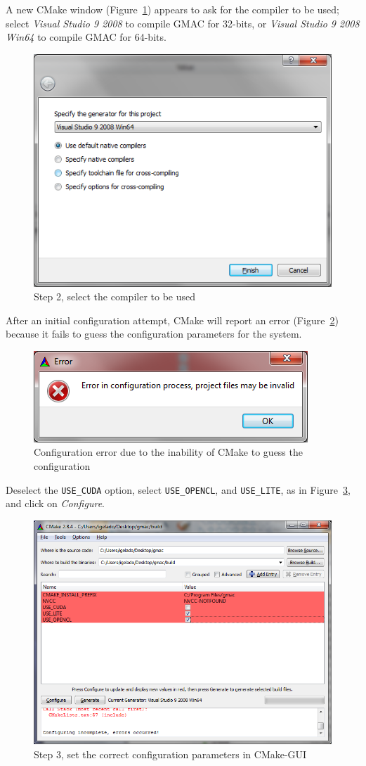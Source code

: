 A new CMake window (Figure~\ref{fig:install:cmake-compiler}) appears to ask for the compiler to be 
used; select \emph{Visual Studio 9 2008} to compile GMAC for 32\hyp{}bits, or \emph{Visual Studio 9 
2008 Win64} to compile GMAC for 64\hyp{}bits.
\begin{figure}[h]
\centering
\includegraphics[width=0.6\linewidth]{installation/figures/cmake-compiler}
\caption{Step 2, select the compiler to be used}
\label{fig:install:cmake-compiler}
\end{figure}

After an initial configuration attempt, CMake will report an error 
(Figure~\ref{fig:install:cmake-conf-error}) because it fails to guess the configuration parameters 
for the system.
\begin{figure}[h]
\centering
\includegraphics[width=0.5\linewidth]{installation/figures/cmake-conf-error}
\caption{Configuration error due to the inability of CMake to guess the configuration}
\label{fig:install:cmake-conf-error}
\end{figure}

Deselect  the \texttt{USE\_CUDA} option, select \texttt{USE\_OPENCL}, and
\texttt{USE\_LITE}, as in Figure~\ref{fig:install:cmake-opencl}, and click on \emph{Configure}.  
\begin{figure}[h]
\centering
\includegraphics[width=0.8\linewidth]{installation/figures/cmake-opencl}
\caption{Step 3, set the correct configuration parameters in CMake\hyp{}GUI}
\label{fig:install:cmake-opencl}
\end{figure}

